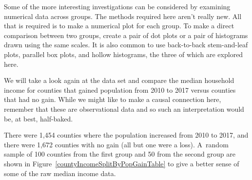 


Some of the more interesting investigations can be considered by examining numerical data across groups. The methods required here aren't really new. All that is required is to make a numerical plot for each group. To make a direct comparison between two groups, create a pair of dot plots or a pair of histograms drawn using the same scales. It is also common to use back-to-back stem-and-leaf plots, parallel box plots, and hollow histograms, the three of which are explored here.

We will take a look again at the  data set
and compare the median household income for counties that
gained population from 2010 to 2017 versus counties that
had no gain.
While we might like to make a causal connection here,
remember that these are observational data and so such
an interpretation would be, at best, half-baked.

\newcommand{\numcountieswithgains}{1454}
\newcommand{\numcountieswithgainsC}{1,454}
\newcommand{\numcountieswithoutgains}{1672}
\newcommand{\numcountieswithoutgainsC}{1,672}

There were \numcountieswithgainsC{} counties where
the population increased from 2010 to 2017, and there
were \numcountieswithoutgainsC{} counties with no gain
(all but one were a loss).
A~random sample of 100 counties from the first group and
50 from the second group are shown in
Figure~\ref{countyIncomeSplitByPopGainTable}
to give a better sense of some of the raw median
income data.

